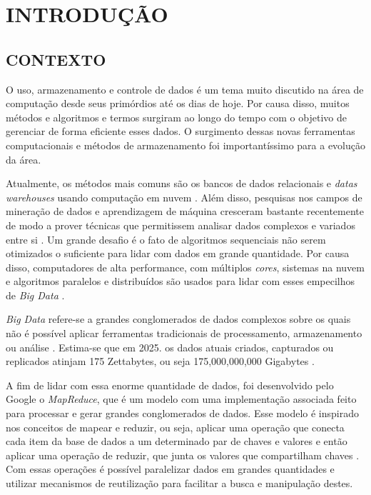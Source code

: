 \chapter{INTRODUÇÃO} \label{cha:introducao}

\section{CONTEXTO} \label{sec:contexto}

O uso, armazenamento e controle de dados é um tema muito discutido na área de computação desde seus primórdios até os dias de hoje. Por causa disso, muitos métodos e algoritmos e termos surgiram ao longo do tempo com o objetivo de gerenciar de forma eficiente esses dados. O surgimento dessas novas ferramentas computacionais e métodos de armazenamento foi importantíssimo para a evolução da área. 

Atualmente, os métodos mais comuns são os bancos de dados relacionais e \textit{datas warehouses} usando computação em nuvem \cite{PastAndFutureTrendsData19}. Além disso, pesquisas nos campos de mineração de dados e aprendizagem de máquina cresceram bastante recentemente de modo a prover técnicas que permitissem analisar dados complexos e variados entre si \cite{ProgrammingBigData22}. Um grande desafio é o fato de algoritmos sequenciais não serem otimizados o suficiente para lidar com dados em grande quantidade. Por causa disso, computadores de alta performance, com múltiplos \textit{cores}, sistemas na nuvem e algoritmos paralelos e distribuídos são usados para lidar com esses empecilhos de \textit{Big Data} \cite{ProgrammingBigData22}.

\textit{Big Data} refere-se a grandes conglomerados de dados complexos sobre os quais não é possível aplicar ferramentas tradicionais de processamento, armazenamento ou análise \cite{OptmizationSoftwareHadoop18}. Estima-se que em 2025. os dados atuais criados, capturados ou replicados atinjam 175 Zettabytes, ou seja 175,000,000,000 Gigabytes \cite{DigitalizationWorld18}.

A fim de lidar com essa enorme quantidade de dados, foi desenvolvido pelo Google o \textit{MapReduce}, que é um modelo com uma implementação associada feito para processar e gerar grandes conglomerados de dados. Esse modelo é inspirado nos conceitos de mapear e reduzir, ou seja, aplicar uma operação que conecta cada item da base de dados a um determinado par de chaves e valores e então aplicar uma operação de reduzir, que junta os valores que compartilham chaves \cite{MapReduce08}. Com essas operações é possível paralelizar dados em grandes quantidades e utilizar mecanismos de reutilização para facilitar a busca e manipulação destes.

